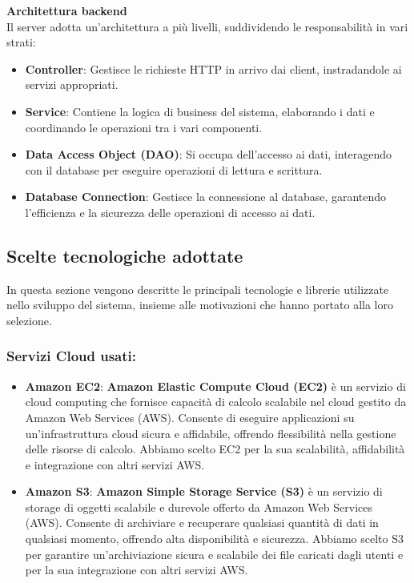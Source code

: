 \textbf{Architettura backend} \\
Il server adotta un'architettura a più livelli, suddividendo le responsabilità in vari strati:
\begin{itemize}
    \item \textbf{Controller}: Gestisce le richieste HTTP in arrivo dai client, instradandole ai servizi appropriati.
    \item \textbf{Service}: Contiene la logica di business del sistema, elaborando i dati e coordinando le operazioni tra i vari componenti.
    \item \textbf{Data Access Object (DAO)}: Si occupa dell'accesso ai dati, interagendo con il database per eseguire operazioni di lettura e scrittura.
    \item \textbf{Database Connection}: Gestisce la connessione al database, garantendo l'efficienza e la sicurezza delle operazioni di accesso ai dati.
\end{itemize}

\newpage
\subsection{Scelte tecnologiche adottate}
In questa sezione vengono descritte le principali tecnologie e librerie utilizzate nello sviluppo del sistema,
insieme alle motivazioni che hanno portato alla loro selezione.
\subsubsection{Servizi Cloud usati:}
\begin{itemize}
    \item \textbf{Amazon EC2}: \textbf{Amazon Elastic Compute Cloud (EC2)} è un servizio di cloud computing che fornisce capacità di calcolo scalabile nel cloud gestito da Amazon Web Services (AWS).
    Consente di eseguire applicazioni su un'infrastruttura cloud sicura e affidabile, offrendo flessibilità nella gestione delle risorse di calcolo. Abbiamo scelto EC2 per la sua scalabilità, affidabilità e integrazione con altri servizi AWS.
    \item \textbf{Amazon S3}: \textbf{Amazon Simple Storage Service (S3)} è un servizio di storage di oggetti scalabile e durevole offerto da Amazon Web Services (AWS).
    Consente di archiviare e recuperare qualsiasi quantità di dati in qualsiasi momento, offrendo alta disponibilità e sicurezza. Abbiamo scelto S3 per garantire un'archiviazione sicura e scalabile dei file caricati dagli utenti e per la sua integrazione con altri servizi AWS.
\end{itemize}